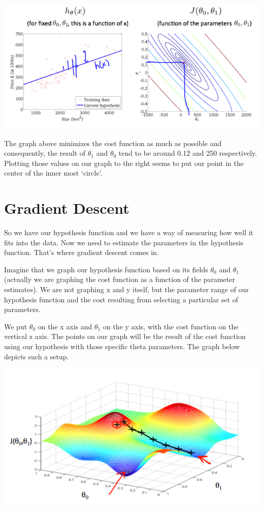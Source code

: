 \documentclass[
]{book}
\begin{document}
\includegraphics{cost_function_intution2_graph3.png}

The graph above minimizes the cost function as much as possible and consequently, the result of \(\theta_1\) and \(\theta_0\) tend to be around 0.12 and 250 respectively. Plotting those values on our graph to the right seems to put our point in the center of the inner most `circle'.

\hypertarget{gradient-descent}{%
\section{Gradient Descent}\label{gradient-descent}}

So we have our hypothesis function and we have a way of measuring how well it fits into the data. Now we need to estimate the parameters in the hypothesis function. That's where gradient descent comes in.

Imagine that we graph our hypothesis function based on its fields \(\theta_0\) and \(\theta_1\) (actually we are graphing the cost function as a function of the parameter estimates). We are not graphing x and y itself, but the parameter range of our hypothesis function and the cost resulting from selecting a particular set of parameters.

We put \(\theta_0\) on the x axis and \(\theta_1\) on the y axis, with the cost function on the vertical z axis. The points on our graph will be the result of the cost function using our hypothesis with those specific theta parameters. The graph below depicts such a setup.

\includegraphics{Gradient_descent_graph_1.png}
\end{document}
